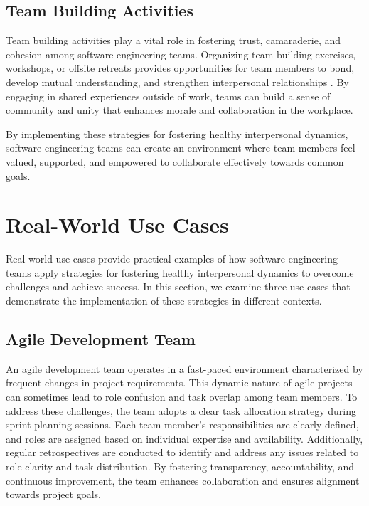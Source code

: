 \documentclass{article}
\begin{document}
\subsection{Team Building Activities}
Team building activities play a vital role in fostering trust, camaraderie, and cohesion among software engineering teams. Organizing team-building exercises, workshops, or offsite retreats provides opportunities for team members to bond, develop mutual understanding, and strengthen interpersonal relationships \cite{SalasEtAl2008}. By engaging in shared experiences outside of work, teams can build a sense of community and unity that enhances morale and collaboration in the workplace.

By implementing these strategies for fostering healthy interpersonal dynamics, software engineering teams can create an environment where team members feel valued, supported, and empowered to collaborate effectively towards common goals.

\section{Real-World Use Cases}
Real-world use cases provide practical examples of how software engineering teams apply strategies for fostering healthy interpersonal dynamics to overcome challenges and achieve success. In this section, we examine three use cases that demonstrate the implementation of these strategies in different contexts.

\subsection{Agile Development Team}
An agile development team operates in a fast-paced environment characterized by frequent changes in project requirements. This dynamic nature of agile projects can sometimes lead to role confusion and task overlap among team members. To address these challenges, the team adopts a clear task allocation strategy during sprint planning sessions. Each team member's responsibilities are clearly defined, and roles are assigned based on individual expertise and availability. Additionally, regular retrospectives are conducted to identify and address any issues related to role clarity and task distribution. By fostering transparency, accountability, and continuous improvement, the team enhances collaboration and ensures alignment towards project goals.
\end{document}
